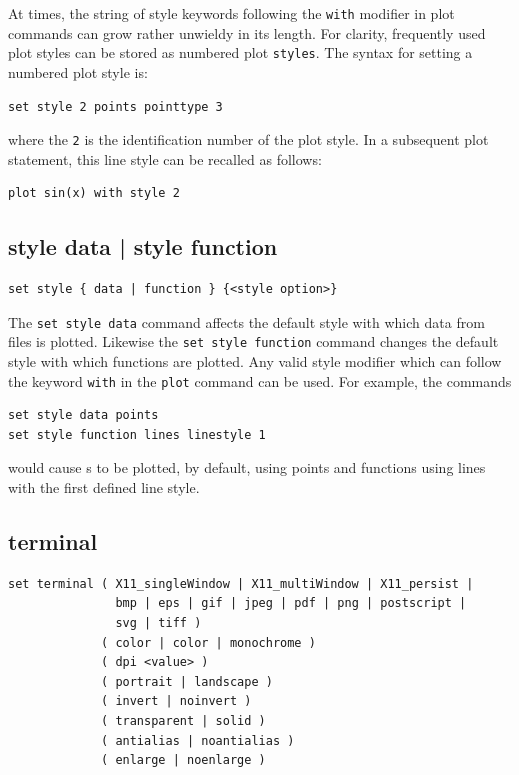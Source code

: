 At times, the string of style keywords following the {\tt with} modifier in
plot commands can grow rather unwieldy in its length. For clarity, frequently
used plot styles can be stored as numbered plot {\tt styles}. The syntax for
setting a numbered plot style is:

\begin{verbatim}
set style 2 points pointtype 3
\end{verbatim}

\noindent where the {\tt 2} is the identification number of the plot style.
In a subsequent plot statement, this line style can be recalled as follows:

\begin{verbatim}
plot sin(x) with style 2
\end{verbatim}


\subsection{style data | style function}

\begin{verbatim}
set style { data | function } {<style option>}
\end{verbatim}

The {\tt set style data} command affects the default style with which data from
files is plotted.  Likewise the {\tt set style function} command changes the
default style with which functions are plotted.  Any valid style modifier which
can follow the keyword {\tt with} in the {\tt plot} command can be used.  For
example, the commands

\begin{verbatim}
set style data points
set style function lines linestyle 1
\end{verbatim}

\noindent would cause \datafile s to be plotted, by default, using points and
functions using lines with the first defined line style.


\subsection{terminal}

\begin{verbatim}
set terminal ( X11_singleWindow | X11_multiWindow | X11_persist |
               bmp | eps | gif | jpeg | pdf | png | postscript |
               svg | tiff )
             ( color | color | monochrome )
             ( dpi <value> )
             ( portrait | landscape )
             ( invert | noinvert )
             ( transparent | solid )
             ( antialias | noantialias )
             ( enlarge | noenlarge )
\end{verbatim}


